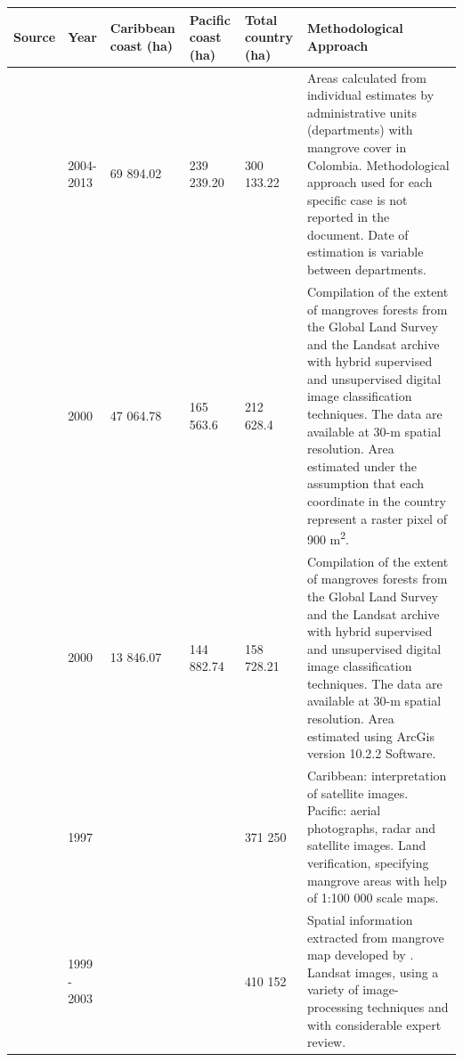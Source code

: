 \documentclass[review, authoryear]{elsarticle}   	%
\begin{document}
\begin{landscape}
\begin{table}[htbp]
   \centering
   \begin{tabular}{p{2cm}p{1cm}p{2cm}p{2cm}p{2cm}p{10cm}} %
      \toprule
       Source  & Year & Caribbean coast (ha) & Pacific coast (ha) & Total country (ha) & Methodological Approach\\
      \midrule
      \citet{INVEMAR2014}         & 2004-2013  & 69 894.02 & 239 239.20 & 300 133.22 & Areas calculated from individual estimates by administrative units (departments) with mangrove cover in Colombia. Methodological approach used for each specific case is not reported in the document. Date of estimation is variable between departments.\\
      \citet{Giri2013, Giri2010}          & 2000  &  47 064.78 &  165 563.6 & 212 628.4 & Compilation of the extent of mangroves forests from the Global Land Survey and the Landsat archive with hybrid supervised and unsupervised digital image classification techniques. The data are available at 30-m spatial resolution. Area estimated under the assumption that each coordinate in the country represent a raster pixel of 900 m\textsuperscript2.\\
      \citet{Giri2013, Giri2010}          & 2000  & 13 846.07 & 144 882.74 & 158 728.21 & Compilation of the extent of mangroves forests from the Global Land Survey and the Landsat archive with hybrid supervised and unsupervised digital image classification techniques. The data are available at 30-m spatial resolution. Area estimated using ArcGis version 10.2.2 Software.\\
     \citet{FAO2007}      & 1997  & & & 371 250 &  Caribbean: interpretation of satellite images. Pacific: aerial photographs, radar and satellite images. Land verification, specifying mangrove areas with help of  1:100 000 scale maps. \\
      \citet{CONL:CONL12060}       & 1999 - 2003& & &410 152 & Spatial information extracted from mangrove map developed by \citet{Spalding2010}. Landsat images, using a variety of image-processing techniques and with considerable expert review. \\
            \bottomrule
   \end{tabular}
   \label{tab:areaMethods}
\end{table}
\end{landscape}
\end{document}
